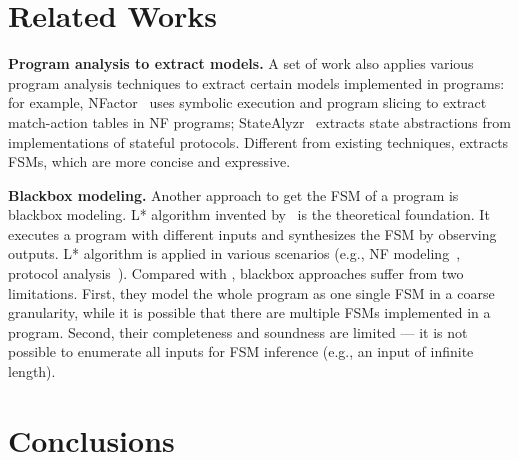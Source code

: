 \section{Related Works}
\label{sec:related}

\noindent\textbf{Program analysis to extract models.} 
A set of work also applies various program analysis techniques 
to extract certain models implemented in programs: 
for example, NFactor~\cite{wu2016automatic} 
uses symbolic execution and program slicing to extract match-action 
tables in NF programs; 
StateAlyzr~\cite{khalid2016paving} extracts state abstractions 
from implementations of stateful protocols. 
Different from existing techniques, \Tool{} extracts FSMs, 
which are more concise and expressive.

\noindent\textbf{Blackbox modeling.} 
Another approach to get the FSM of a program is blackbox modeling. 
L* algorithm invented by~\citet{angluin1987learning} 
is the theoretical foundation.
It executes a program with different inputs and 
synthesizes the FSM by observing outputs.  
L* algorithm is applied in various scenarios 
(e.g., NF modeling~\cite{moon2019alembic}, 
protocol analysis~\cite{cho2011mace}). 
Compared with \Tool{}, blackbox approaches suffer from two limitations. 
First, they model the whole program as one single FSM in a coarse granularity, 
while it is possible that there are multiple FSMs implemented in a program. 
Second, their completeness and soundness are limited --- 
it is not possible to enumerate all inputs for 
FSM inference (e.g., an input of infinite length).



\section{Conclusions}